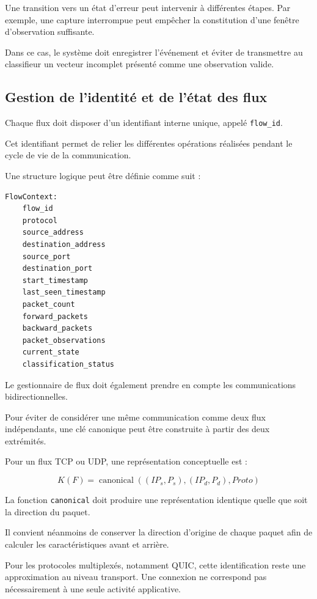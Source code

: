 Une transition vers un état d'erreur peut intervenir à différentes étapes. Par exemple, une capture interrompue peut empêcher la constitution d'une fenêtre d'observation suffisante.

Dans ce cas, le système doit enregistrer l'événement et éviter de transmettre au classifieur un vecteur incomplet présenté comme une observation valide.

\subsection{Gestion de l'identité et de l'état des flux}

Chaque flux doit disposer d'un identifiant interne unique, appelé \texttt{flow\_id}.

Cet identifiant permet de relier les différentes opérations réalisées pendant le cycle de vie de la communication.

Une structure logique peut être définie comme suit :

\begin{verbatim}
FlowContext:
    flow_id
    protocol
    source_address
    destination_address
    source_port
    destination_port
    start_timestamp
    last_seen_timestamp
    packet_count
    forward_packets
    backward_packets
    packet_observations
    current_state
    classification_status
\end{verbatim}

Le gestionnaire de flux doit également prendre en compte les communications bidirectionnelles.

Pour éviter de considérer une même communication comme deux flux indépendants, une clé canonique peut être construite à partir des deux extrémités.

Pour un flux TCP ou UDP, une représentation conceptuelle est :

\[
K(F)=\operatorname{canonical}
\left(
(IP_s,P_s),(IP_d,P_d),Proto
\right)
\]

La fonction \texttt{canonical} doit produire une représentation identique quelle que soit la direction du paquet.

Il convient néanmoins de conserver la direction d'origine de chaque paquet afin de calculer les caractéristiques avant et arrière.

Pour les protocoles multiplexés, notamment QUIC, cette identification reste une approximation au niveau transport. Une connexion ne correspond pas nécessairement à une seule activité applicative.

